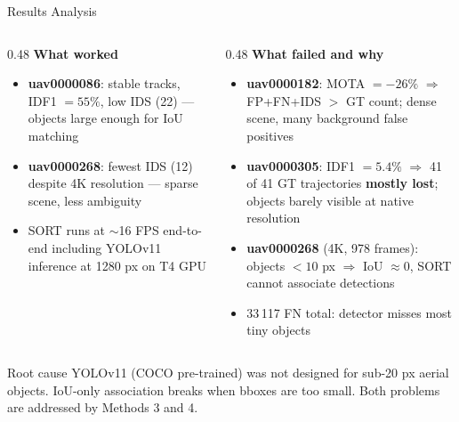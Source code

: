 \documentclass[aspectratio=169]{beamer}
\begin{document}
\begin{frame}{Results Analysis}
  \begin{columns}[T]
    \begin{column}{0.48\textwidth}
      \textbf{What worked}
      \begin{itemize}
        \item \textbf{uav0000086}: stable tracks, IDF1 $=55\%$,
              low IDS (22) — objects large enough for IoU matching
        \item \textbf{uav0000268}: fewest IDS (12) despite 4K resolution
              — sparse scene, less ambiguity
        \item SORT runs at $\sim$16 FPS end-to-end including YOLOv11
              inference at 1280 px on T4 GPU
      \end{itemize}
    \end{column}
    \begin{column}{0.48\textwidth}
      \textbf{What failed and why}
      \begin{itemize}
        \item \textbf{uav0000182}: MOTA $=-26\%$
              $\Rightarrow$ FP+FN+IDS $>$ GT count;
              dense scene, many background false positives
        \item \textbf{uav0000305}: IDF1 $=5.4\%$
              $\Rightarrow$ 41 of 41 GT trajectories \textbf{mostly lost};
              objects barely visible at native resolution
        \item \textbf{uav0000268} (4K, 978 frames):
              objects $<10$ px $\Rightarrow$ IoU $\approx 0$,
              SORT cannot associate detections
        \item 33\,117 FN total: detector misses most tiny objects
      \end{itemize}
    \end{column}
  \end{columns}
  \vspace{0.3em}
  \begin{block}{Root cause}
    \small YOLOv11 (COCO pre-trained) was not designed for sub-20 px aerial objects.
    IoU-only association breaks when bboxes are too small.
    Both problems are addressed by Methods 3 and 4.
  \end{block}
\end{frame}
\end{document}
